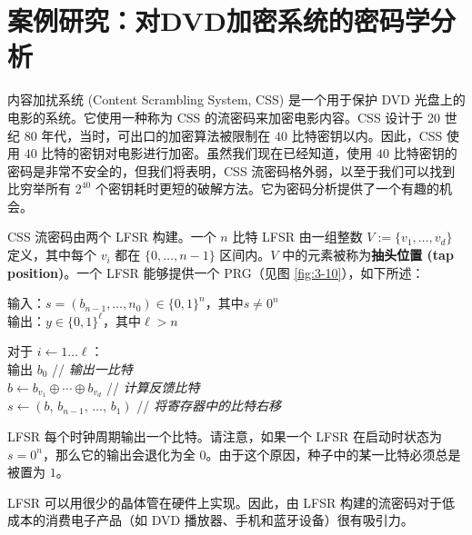 \section{案例研究：对DVD加密系统的密码学分析}\label{sec:3-8}

内容加扰系统 (Content Scrambling System, CSS) 是一个用于保护 DVD 光盘上的电影的系统。它使用一种称为 CSS 的流密码来加密电影内容。CSS 设计于 20 世纪 80 年代，当时，可出口的加密算法被限制在 $40$ 比特密钥以内。因此，CSS 使用 $40$ 比特的密钥对电影进行加密。虽然我们现在已经知道，使用 $40$ 比特密钥的密码是非常不安全的，但我们将表明，CSS 流密码格外弱，以至于我们可以找到比穷举所有 $2^{40}$ 个密钥耗时更短的破解方法。它为密码分析提供了一个有趣的机会。

\begin{snote}
CSS 流密码由两个 LFSR 构建。一个 $n$ 比特 LFSR 由一组整数 $V:=\{v_1,\dots,v_d\}$ 定义，其中每个 $v_i$ 都在 $\{0,\dots,n-1\}$ 区间内。$V$ 中的元素被称为\textbf{抽头位置 (tap position)}。一个 LFSR 能够提供一个 PRG（见图 \ref{fig:3-10}），如下所述：

\vspace*{10pt}

\hspace*{5pt} 输入：$s=(b_{n-1},\dots,n_0)\in\{0,1\}^n$，其中$s\neq 0^n$\\
\hspace*{26pt} 输出：$y\in\{0,1\}^\ell$，其中$\ell>n$

\vspace*{5pt}

\hspace*{5pt} 对于 $i\leftarrow1\dots\ell$：\\
\hspace*{26pt} \quad\quad\quad 输出 $b_0$
\hspace*{86.5pt} // \emph{输出一比特}\\
\hspace*{26pt} \quad\quad\quad $b\leftarrow b_{v_1}\oplus\cdots\oplus b_{v_d}$
\hspace*{34.5pt} // \emph{计算反馈比特}\\
\hspace*{26pt} \quad\quad\quad $s\leftarrow(b,\,b_{n-1},\,\dots,\,b_1)$
\hspace*{22.5pt} // \emph{将寄存器中的比特右移}

\vspace*{10pt}

\noindent
LFSR 每个时钟周期输出一个比特。请注意，如果一个 LFSR 在启动时状态为 $s=0^n$，那么它的输出会退化为全 $0$。由于这个原因，种子中的某一比特必须总是被置为 $1$。

LFSR 可以用很少的晶体管在硬件上实现。因此，由 LFSR 构建的流密码对于低成本的消费电子产品（如 DVD 播放器、手机和蓝牙设备）很有吸引力。
\end{snote}

